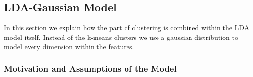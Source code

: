 \documentclass[11pt,a4paper]{article}
\begin{document}
% 
%  
% 
% 

\subsection{LDA-Gaussian Model}
In this section we explain how the part of clustering is combined within the LDA model itself. Instead of the k-means clusters we use a gaussian distribution to model every dimension within the features.


  \subsubsection{Motivation and Assumptions of the Model}
  
\end{document}
